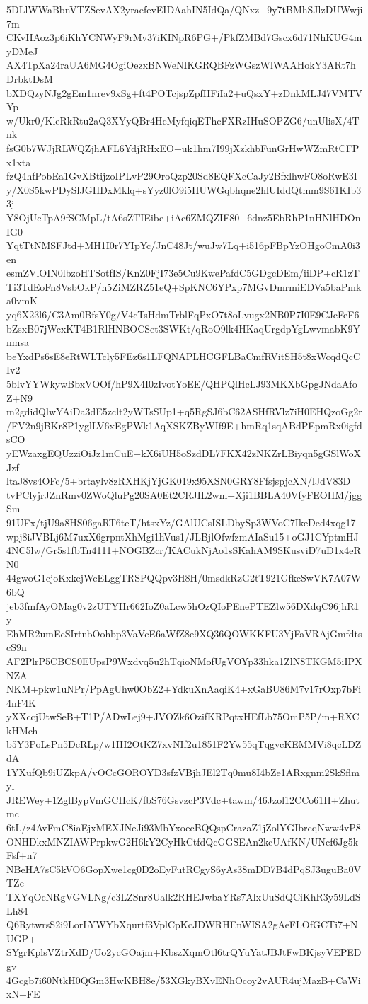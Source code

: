 5DLlWWaBbnVTZSevAX2yraefevEIDAahIN5IdQa/QNxz+9y7tBMhSJlzDUWwji7m
CKvHAoz3p6iKhYCNWyF9rMv37iKINpR6PG+/PkfZMBd7Gscx6d71NhKUG4myDMeJ
AX4TpXa24raUA6MG4OgiOezxBNWeNIKGRQBFzWGszWlWAAHokY3ARt7hDrbktDsM
bXDQzyNJg2gEm1nrev9xSg+ft4POTcjspZpfHFiIa2+uQsxY+zDnkMLJ47VMTVYp
w/Ukr0/KleRkRtu2aQ3XYyQBr4HcMyfqiqEThcFXRzIHuSOPZG6/unUlisX/4Tnk
fsG0b7WJjRLWQZjhAFL6YdjRHxEO+uk1hm7I99jXzkhbFunGrHwWZmRtCFPx1xta
fzQ4hfPobEa1GvXBtijzoIPLvP29OroQzp20Sd8EQFXcCaJy2BfxlhwFO8oRwE3I
y/X0S5kwPDySlJGHDxMklq+sYyz0lO9i5HUWGqbhqne2hlUIddQtmm9S61KIb33j
Y8OjUcTpA9fSCMpL/tA6sZTIEibe+iAc6ZMQZIF80+6dnz5EbRhP1nHNlHDOnIG0
YqtTtNMSFJtd+MH1I0r7YIpYc/JnC48Jt/wuJw7Lq+i516pFBpYzOHgoCmA0i3en
esmZVlOIN0lbzoHTSotfIS/KnZ0FjI73e5Cu9KwePafdC5GDgcDEm/iiDP+cR1zT
Ti3TdEoFn8VsbOkP/h5ZiMZRZ51eQ+SpKNC6YPxp7MGvDmrmiEDVa5baPmka0vmK
yq6X23l6/C3Am0BfsY0g/V4cTsHdmTrblFqPxO7t8oLvugx2NB0P7I0E9CJcFeF6
bZsxB07jWcxKT4B1RlHNBOCSet3SWKt/qRoO9lk4HKaqUrgdpYgLwvmabK9Ynmsa
beYxdPs6sE8eRtWLTcly5FEz6s1LFQNAPLHCGFLBaCmfRVitSH5t8xWcqdQcCIv2
5blvYYWkywBbxVOOf/hP9X4I0zIvotYoEE/QHPQlHcLJ93MKXbGpgJNdaAfoZ+N9
m2gdidQlwYAiDa3dE5zclt2yWTsSUp1+q5RgSJ6bC62ASHfRVlz7iH0EHQzoGg2r
/FV2n9jBKr8P1yglLV6xEgPWk1AqXSKZByWIf9E+hmRq1sqABdPEpmRx0igfdsCO
yEWzaxgEQUzziOiJz1mCuE+kX6iUH5oSzdDL7FKX42zNKZrLBiyqn5gGSlWoXJzf
ltaJ8vs4OFc/5+brtaylv8zRXHKjYjGK019x95XSN0GRY8FfsjspjcXN/lJdV83D
tvPClyjrJZnRmv0ZWoQluPg20SA0Et2CRJIL2wm+Xji1BBLA40VfyFEOHM/jggSm
91UFx/tjU9a8HS06gaRT6teT/htsxYz/GAlUCsISLDbySp3WVoC7IkeDed4xqg17
wpj8iJVBLj6M7uxX6grpntXhMgi1hVus1/JLBjlOfwfzmAIaSu15+oGJ1CYptmHJ
4NC5lw/Gr5s1fbTn4111+NOGBZcr/KACukNjAo1sSKahAM9SKusviD7uD1x4eRN0
44gwoG1cjoKxkejWcELggTRSPQQpv3H8H/0msdkRzG2tT921GfkcSwVK7A07W6bQ
jeb3fmfAyOMag0v2zUTYHr662IoZ0aLcw5hOzQIoPEnePTEZlw56DXdqC96jhR1y
EhMR2umEcSIrtnbOohbp3VaVcE6aWfZ8e9XQ36QOWKKFU3YjFaVRAjGmfdtscS9n
AF2PlrP5CBCS0EUpsP9Wxdvq5u2hTqioNMofUgVOYp33hka1ZlN8TKGM5iIPXNZA
NKM+pkw1uNPr/PpAgUhw0ObZ2+YdkuXnAaqiK4+xGaBU86M7v17rOxp7bFi4nF4K
yXXccjUtwSeB+T1P/ADwLej9+JVOZk6OzifKRPqtxHEfLb75OmP5P/m+RXCkHMch
b5Y3PoLsPn5DcRLp/w1IH2OtKZ7xvNIf2u1851F2Yw55qTqgvcKEMMVi8qcLDZdA
1YXufQb9iUZkpA/vOCcGOROYD3sfzVBjhJEl2Tq0mu8I4bZe1ARxgnm2SkSflmyl
JREWey+1ZglBypVmGCHcK/fbS76GsvzcP3Vdc+tawm/46Jzol12CCo61H+Zhutmc
6tL/z4AvFmC8iaEjxMEXJNeJi93MbYxoecBQQspCrazaZ1jZolYGIbrcqNww4vP8
ONHDkxMNZIAWPrpkwG2H6kY2CyHkCtfdQcGGSEAn2kcUAfKN/UNcf6Jg5kFsf+n7
NBeHA7sC5kVO6GopXwe1cg0D2oEyFutRCgyS6yAs38mDD7B4dPqSJ3uguBa0VTZe
TXYqOcNRgVGVLNg/c3LZSnr8Ualk2RHEJwbaYRs7AlxUuSdQCiKhR3y59LdSLh84
Q6RytwrsS2i9LorLYWYbXqurtf3VplCpKcJDWRHEnWISA2gAeFLOfGCTi7+NUGP+
SYgrKplsVZtrXdD/Uo2ycGOajm+KbszXqmOtl6trQYuYatJBJtFwBKjsyVEPEDgv
4Gcgb7i60NtkH0QGm3HwKBH8e/53XGkyBXvENhOcoy2vAUR4ujMazB+CaWixN+FE
